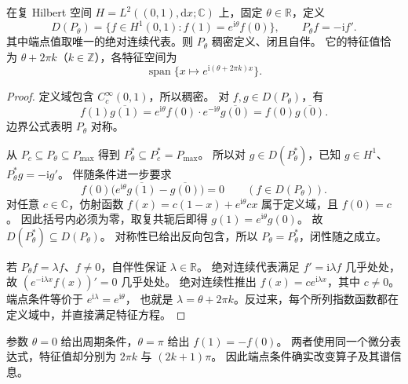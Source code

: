 \begin{theorem}[相位边界条件的一阶自伴算子]
\label{b1:thm:29-phase-derivative}
在复 Hilbert 空间 \(H=L^2((0,1),\mathrm dx;\mathbb C)\) 上，固定 \(\theta\in\mathbb R\)，定义
\[
 D(P_\theta)=\{f\in H^1(0,1):f(1)=e^{\mathrm i\theta}f(0)\},
 \qquad P_\theta f=-\mathrm if'.
\]
其中端点值取唯一的绝对连续代表。则 \(P_\theta\) 稠密定义、闭且自伴。
它的特征值恰为 \(\theta+2\pi k\)（\(k\in\mathbb Z\)），各特征空间为
\[
 \operatorname{span}\{x\mapsto e^{\mathrm i(\theta+2\pi k)x}\}.
\]
\end{theorem}
\begin{proof}
定义域包含 \(C_c^\infty(0,1)\)，所以稠密。
对 \(f,g\in D(P_\theta)\)，有
\[
 f(1)\overline{g(1)}
 =e^{\mathrm i\theta}f(0)\cdot e^{-\mathrm i\theta}\overline{g(0)}
 =f(0)\overline{g(0)}.
\]
边界公式表明 \(P_\theta\) 对称。

从 \(P_c\subseteq P_\theta\subseteq P_{\max}\) 得到
\(P_\theta^*\subseteq P_c^*=P_{\max}\)。
所以对 \(g\in D(P_\theta^*)\)，已知 \(g\in H^1\)、\(P_\theta^*g=-\mathrm ig'\)。
伴随条件进一步要求
\[
 f(0)\bigl(e^{\mathrm i\theta}\overline{g(1)}-\overline{g(0)}\bigr)=0
 \qquad(f\in D(P_\theta)).
\]
对任意 \(c\in\mathbb C\)，仿射函数
\(f(x)=c(1-x)+e^{\mathrm i\theta}cx\) 属于定义域，且 \(f(0)=c\)。
因此括号内必须为零，取复共轭后即得 \(g(1)=e^{\mathrm i\theta}g(0)\)。
故 \(D(P_\theta^*)\subseteq D(P_\theta)\)。
对称性已给出反向包含，所以 \(P_\theta=P_\theta^*\)，闭性随之成立。

若 \(P_\theta f=\lambda f\)、\(f\ne0\)，自伴性保证 \(\lambda\in\mathbb R\)。
绝对连续代表满足 \(f'=\mathrm i\lambda f\) 几乎处处，故
\((e^{-\mathrm i\lambda x}f(x))'=0\) 几乎处处。
绝对连续性推出 \(f(x)=ce^{\mathrm i\lambda x}\)，其中 \(c\ne0\)。
端点条件等价于 \(e^{\mathrm i\lambda}=e^{\mathrm i\theta}\)，
也就是 \(\lambda=\theta+2\pi k\)。反过来，每个所列指数函数都在定义域中，并直接满足特征方程。
\end{proof}

参数 \(\theta=0\) 给出周期条件，\(\theta=\pi\) 给出 \(f(1)=-f(0)\)。
两者使用同一个微分表达式，特征值却分别为 \(2\pi k\) 与 \((2k+1)\pi\)。
因此端点条件确实改变算子及其谱信息。

